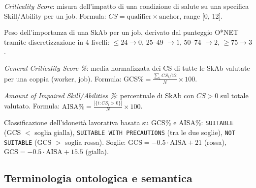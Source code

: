 \documentclass[a4paper,12pt]{article}
\begin{document}
\begin{description}[leftmargin=4cm, labelwidth=3.8cm, labelsep=0.2cm]

\item[\textbf{CS}]
  \textit{Criticality Score}: misura dell'impatto di una condizione di salute
  su una specifica Skill/Ability per un job.
  Formula: $CS = \text{qualifier} \times \text{anchor}$, range [0, 12].

\item[\textbf{Anchor}]
  Peso dell'importanza di una SkAb per un job, derivato dal punteggio O*NET
  tramite discretizzazione in 4 livelli: $\leq 24 \rightarrow 0$,
  25--49 $\rightarrow 1$, 50--74 $\rightarrow 2$, $\geq 75 \rightarrow 3$.

\item[\textbf{GCS\%}]
  \textit{General Criticality Score \%}: media normalizzata dei CS di tutte
  le SkAb valutate per una coppia (worker, job).
  Formula: $\text{GCS\%} = \frac{\sum_i CS_i/12}{N} \times 100$.

\item[\textbf{AISA\%}]
  \textit{Amount of Impaired Skill/Abilities \%}: percentuale di SkAb con
  $CS > 0$ sul totale valutato.
  Formula: $\text{AISA\%} = \frac{|\{i : CS_i > 0\}|}{N} \times 100$.

\item[\textbf{Suitability}]
  Classificazione dell'idoneit\`{a} lavorativa basata su GCS\% e AISA\%:
  \texttt{SUITABLE} (GCS $<$ soglia gialla), \texttt{SUITABLE WITH PRECAUTIONS}
  (tra le due soglie), \texttt{NOT SUITABLE} (GCS $>$ soglia rossa).
  Soglie: $\text{GCS} = -0.5 \cdot \text{AISA} + 21$ (rossa),
  $\text{GCS} = -0.5 \cdot \text{AISA} + 15.5$ (gialla).

\end{description}

\subsection*{Terminologia ontologica e semantica}
\end{document}
